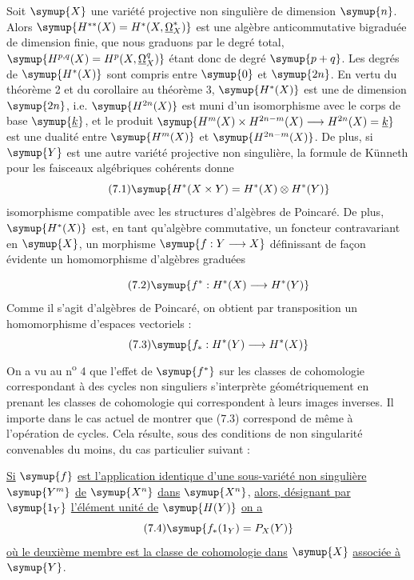 Soit $\symup{X}$ une variété projective non singulière de dimension $\symup{n}$. Alors
$\symup{H^{**}(X)=H^{*}(X,\underline{\Omega}_X^{*})}$ est une algèbre anticommutative bigraduée de dimension finie, que nous graduons
par le degré total, $\symup{H^{p,q}(X)=H^{p}(X,\underline{\Omega}_X^{q})}$ étant donc de degré
$\symup{p+q}$. Les degrés de $\symup{H^{*}(X)}$ sont compris entre $\symup{0}$ et $\symup{2n}$. En vertu du
théorème 2 et du corollaire au théorème 3, $\symup{H^{*}(X)}$ est une  de dimension $\symup{2n}$, i.e. $\symup{H^{2n}(X)}$ est muni d'un isomorphisme avec
le corps de base $\symup{\underline{k}}$, et le produit
$\symup{H^{m}(X)\times H^{2n-m}(X)\longrightarrow H^{2n}(X)=\underline{k}}$ est une dualité entre $\symup{H^{m}(X)}$ et $\symup{H^{2n-m}(X)}$. De plus, si $\symup{Y}$ est une
autre variété projective non singulière, la formule de Künneth pour les
faisceaux algébriques cohérents donne
\begin{equation}\tag{7.1}
  \symup{H^{*}(X\times Y)=H^{*}(X)\otimes H^{*}(Y)}
\end{equation}
isomorphisme compatible avec les structures d'algèbres de Poincaré. De plus,
$\symup{H^{*}(X)}$ est, en tant qu'algèbre commutative, un foncteur contravariant en
$\symup{X}$, un morphisme $\symup{f:Y\longrightarrow X}$ définissant de façon évidente un
homomorphisme d'algèbres graduées

\begin{equation}\tag{7.2}
  \symup{f^{*}:H^{*}(X)\longrightarrow H^{*}(Y)}
\end{equation}
Comme il s'agit d'algèbres de Poincaré, on obtient par transposition un
homomorphisme d'espaces vectoriels :
\begin{equation}\tag{7.3}
  \symup{f_{*}:H^{*}(Y)\longrightarrow H^{*}(X)}
\end{equation}
On a vu au n\textsuperscript{o} 4 que l'effet de $\symup{f^{*}}$ sur les classes de
cohomologie correspondant à des cycles non singuliers s'interprète
géométriquement en prenant les classes de cohomologie qui correspondent à leurs
images inverses. Il importe dans le cas actuel de montrer que (7.3) correspond
de même à l'opération  de cycles. Cela résulte, sous des
conditions de non singularité convenables du moins, du cas particulier suivant :

 \uline{Si} $\symup{f}$ \uline{est l'application identique d'une sous-variété non
singulière} $\symup{Y^{m}}$ \uline{de} $\symup{X^{n}}$ \uline{dans} $\symup{X^{n}}$, \uline{alors, désignant par} $\symup{1_Y}$
\uline{l'élément unité de} $\symup{H(Y)}$ \uline{on a}
\begin{equation}\tag{7.4}
  \symup{f_{*}(1_Y)=P_X(Y)}
\end{equation}
\uline{où le deuxième membre est la classe de cohomologie dans} $\symup{X}$ \uline{associée à} $\symup{Y}$.

